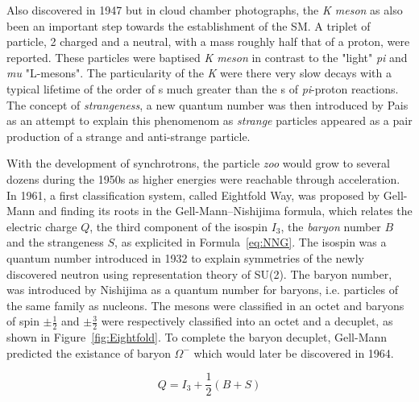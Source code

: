 	Also discovered in 1947 but in cloud chamber photographs, the \textit{K meson} as also been an important step towards the establishment of the \acl{SM}. A triplet of particle, 2 charged and a neutral, with a mass roughly half that of a proton, were reported. These particles were baptised \textit{K meson} in contrast to the "light" \textit{pi} and \textit{mu} "L-mesons". The particularity of the \textit{K} were there very slow decays with a typical lifetime of the order of \si{s} much greater than the \si{s} of \textit{pi}-proton reactions. The concept of \textit{strangeness}, a new quantum number was then introduced by Pais as an attempt to explain this phenomenom as \textit{strange} particles appeared as a pair production of a strange and anti-strange particle.
	
	With the development of synchrotrons, the particle \textit{zoo} would grow to several dozens during the 1950s as higher energies were reachable through acceleration. In 1961, a first classification system, called Eightfold Way, was proposed by Gell-Mann and finding its roots in the Gell-Mann--Nishijima formula, which relates the electric charge $Q$, the third component of the isospin $I_3$, the \textit{baryon} number $B$ and the strangeness $S$, as explicited in Formula~\ref{eq:NNG}. The isospin was a quantum number introduced in 1932 to explain symmetries of the newly discovered neutron using representation theory of SU(2). The baryon number, was introduced by Nishijima as a quantum number for baryons, i.e. particles of the same family as nucleons. The mesons were classified in an octet and baryons of spin $\pm\frac{1}{2}$ and $\pm\frac{3}{2}$ were respectively classified into an octet and a decuplet, as shown in Figure~\ref{fig:Eightfold}. To complete the baryon decuplet, Gell-Mann predicted the existance of baryon $\Omega^-$ which would later be discovered in 1964.
	
	\begin{equation}
		\label{eq:NNG}
		Q = I_3 + \frac{1}{2}(B+S)
	\end{equation}
	
